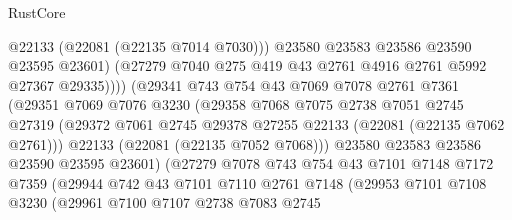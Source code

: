 \begin{lexlean}{RustCore}
\begin{coremodule}
                                  @22133
                                  (@22081 (@22135 @7014 @7030)))
                                @23580
                                @23583
                                @23586
                                @23590
                                @23595
                                @23601)
                              (@27279 @7040 @275 @419 @43 @2761 @4916 @2761 @5992 @27367 @29335))))
                        (@29341
                          @743
                          @754
                          @43
                          @7069
                          @7078
                          @2761
                          @7361
                          (@29351
                            @7069
                            @7076
                            @3230
                            (@29358
                              @7068
                              @7075
                              @2738
                              @7051
                              @2745
                              @27319
                              (@29372
                                @7061
                                @2745
                                @29378
                                @27255
                                @22133
                                (@22081 (@22135 @7062 @2761)))
                              @22133
                              (@22081 (@22135 @7052 @7068)))
                            @23580
                            @23583
                            @23586
                            @23590
                            @23595
                            @23601)
                          (@27279
                            @7078
                            @743
                            @754
                            @43
                            @7101
                            @7148
                            @7172
                            @7359
                            (@29944
                              @742
                              @43
                              @7101
                              @7110
                              @2761
                              @7148
                              (@29953
                                @7101
                                @7108
                                @3230
                                (@29961
                                  @7100
                                  @7107
                                  @2738
                                  @7083
                                  @2745

\end{coremodule}
\end{lexlean}
